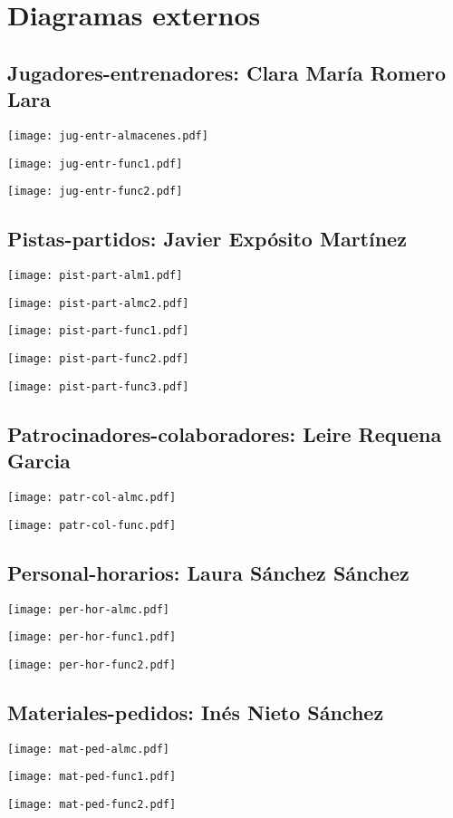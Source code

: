 \section{Diagramas externos}

\subsection{Jugadores-entrenadores: Clara María Romero Lara}

\texttt{[image: jug-entr-almacenes.pdf]}

\texttt{[image: jug-entr-func1.pdf]}

\texttt{[image: jug-entr-func2.pdf]}

\pagebreak
\subsection{Pistas-partidos: Javier Expósito Martínez}

\texttt{[image: pist-part-alm1.pdf]}

\texttt{[image: pist-part-almc2.pdf]}

\texttt{[image: pist-part-func1.pdf]}

\texttt{[image: pist-part-func2.pdf]}

\texttt{[image: pist-part-func3.pdf]}


\subsection{Patrocinadores-colaboradores: Leire Requena Garcia}

\texttt{[image: patr-col-almc.pdf]}

\texttt{[image: patr-col-func.pdf]}

\pagebreak

\subsection{Personal-horarios: Laura Sánchez Sánchez}

\texttt{[image: per-hor-almc.pdf]}

\texttt{[image: per-hor-func1.pdf]}

\texttt{[image: per-hor-func2.pdf]}

\subsection{Materiales-pedidos: Inés Nieto Sánchez}

\texttt{[image: mat-ped-almc.pdf]}

\texttt{[image: mat-ped-func1.pdf]}

\texttt{[image: mat-ped-func2.pdf]}